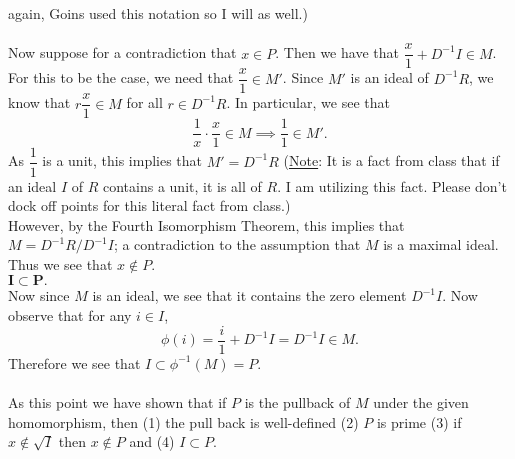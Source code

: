 \begin{prf}
\begin{enumerate}
            again, Goins used this notation so I will as well.)
            \\
            \\
            Now suppose for a contradiction that $x \in P$. Then we have that $\dfrac{x}{1} +
            D^{-1}I \in M$. For this to be the case, we need that $\dfrac{x}{1} \in
            M'$. Since $M'$ is an ideal of $D^{-1}R$, we know that
            $r\dfrac{x}{1} \in M$ for all $r \in D^{-1}R$. In particular, we see that 
            \[
                \dfrac{1}{x} \cdot \dfrac{x}{1} \in M \implies \dfrac{1}{1} \in M'.
            \]
            As $\dfrac{1}{1}$ is a unit, this implies that $M' = D^{-1}R$
            (\underline{Note}: It is a fact from class that if an ideal
            $I$ of $R$ contains a unit, it is all of $R$. I am utilizing
            this fact. Please don't dock off points for this literal fact
            from class.)
            \\
            However, by the Fourth Isomorphism Theorem, this implies that
            $M = D^{-1}R/D^{-1}I$; a contradiction to the assumption that
            $M$ is a maximal ideal. Thus we see that $x \not\in P$. 
            \\[1.2ex]
            \underline{$\bm{I \subset P}.$}\\[1.2ex]
            Now since $M$ is an ideal, we see that it contains the zero
            element $D^{-1}I$. Now observe that for any $i \in I$,
            \[
                \phi(i) = \dfrac{i}{1} + D^{-1}I = D^{-1}I \in M.
            \]
            Therefore we see that $I \subset \phi^{-1}(M) = P$.
            \\
            \\
            As this point we have shown that if $P$ is the pullback of $M$
            under the given homomorphism, then (1) the pull back is well-defined (2) $P$ is prime (3) if $x
            \not\in \sqrt{I}$ then $x \not\in P$ and (4) $I \subset P$.
            

\end{enumerate}
\end{prf}
